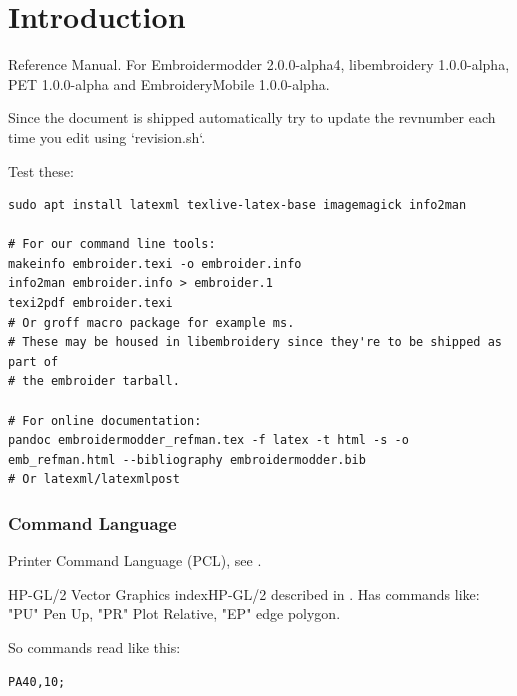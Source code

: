 


\chapter{Introduction}

Reference Manual. For
Embroidermodder 2.0.0-alpha4, libembroidery 1.0.0-alpha, PET 1.0.0-alpha
and EmbroideryMobile 1.0.0-alpha.

Since the document is shipped automatically try to update the revnumber each
time you edit using `revision.sh`.

Test these:

\begin{verbatim}
sudo apt install latexml texlive-latex-base imagemagick info2man

# For our command line tools:
makeinfo embroider.texi -o embroider.info
info2man embroider.info > embroider.1
texi2pdf embroider.texi
# Or groff macro package for example ms.
# These may be housed in libembroidery since they're to be shipped as part of
# the embroider tarball.

# For online documentation:
pandoc embroidermodder_refman.tex -f latex -t html -s -o emb_refman.html --bibliography embroidermodder.bib
# Or latexml/latexmlpost
\end{verbatim}

\subsection{Command Language}

Printer Command Language (PCL), see \citet{packard1992pcl}.

HP-GL/2 Vector Graphics  index{HP-GL/2} described in \citet{packard1992pcl}.
Has commands like: "PU" Pen Up, "PR" Plot Relative, "EP" edge polygon.

So commands read like this:

\begin{verbatim}
PA40,10;
\end{verbatim}

